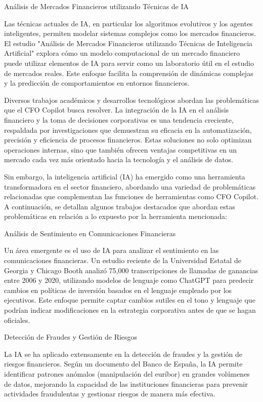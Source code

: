 \documentclass[12pt,letterpaper,oneside]{report}
\renewcommand{\_}{\UnderscoreOriginal\allowbreak}
\begin{document}
Análisis de Mercados Financieros utilizando Técnicas de IA \parencite{David2024}

Las técnicas actuales de IA, en particular los algoritmos evolutivos y los agentes inteligentes, permiten modelar sistemas complejos como los mercados financieros. El estudio "Análisis de Mercados Financieros utilizando Técnicas de Inteligencia Artificial" explora cómo un modelo computacional de un mercado financiero puede utilizar elementos de IA para servir como un laboratorio útil en el estudio de mercados reales. Este enfoque facilita la comprensión de dinámicas complejas y la predicción de comportamientos en entornos financieros.

Diversos trabajos académicos y desarrollos tecnológicos abordan las problemáticas que el CFO Copilot busca resolver. La integración de la IA en el análisis financiero y la toma de decisiones corporativas es una tendencia creciente, respaldada por investigaciones que demuestran su eficacia en la automatización, precisión y eficiencia de procesos financieros. Estas soluciones no solo optimizan operaciones internas, sino que también ofrecen ventajas competitivas en un mercado cada vez más orientado hacia la tecnología y el análisis de datos.

Sin embargo, la inteligencia artificial (IA) ha emergido como una herramienta transformadora en el sector financiero, abordando una variedad de problemáticas relacionadas que complementan las funciones de herramientas como CFO Copilot. A continuación, se detallan algunos trabajos destacados que abordan estas problemáticas en relación a lo expuesto por la herramienta mencionada:

Análisis de Sentimiento en Comunicaciones Financieras \parencite{DaraAbasi2025}

Un área emergente es el uso de IA para analizar el sentimiento en las comunicaciones financieras. Un estudio reciente de la Universidad Estatal de Georgia y Chicago Booth analizó 75,000 transcripciones de llamadas de ganancias entre 2006 y 2020, utilizando modelos de lenguaje como ChatGPT para predecir cambios en políticas de inversión basados en el lenguaje empleado por los ejecutivos. Este enfoque permite captar cambios sutiles en el tono y lenguaje que podrían indicar modificaciones en la estrategia corporativa antes de que se hagan oficiales.

Detección de Fraudes y Gestión de Riesgos \parencite{Baesens2015}

La IA se ha aplicado extensamente en la detección de fraudes y la gestión de riesgos financieros. Según un documento del Banco de España, la IA permite identificar patrones anómalos (manipulación del euríbor) \parencite{Herrera2022} en grandes volúmenes de datos, mejorando la capacidad de las instituciones financieras para prevenir actividades fraudulentas y gestionar riesgos de manera más efectiva.
\end{document}
